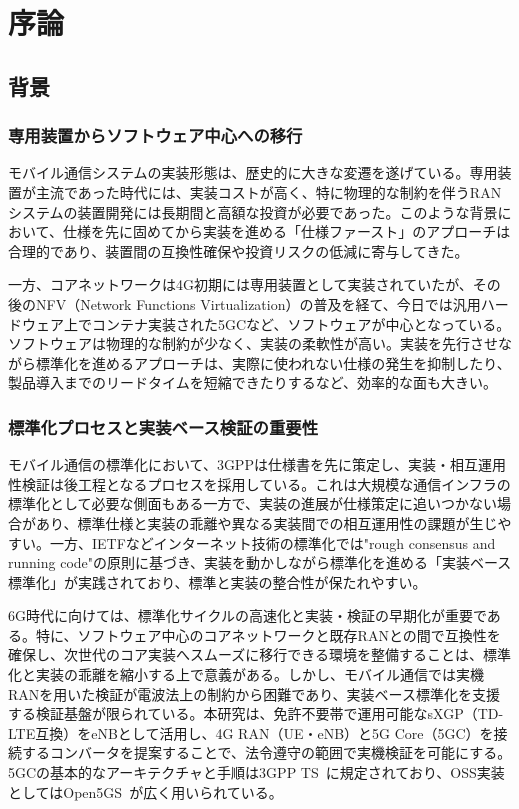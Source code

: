 \chapter{序論}

\section{背景}
\subsection{専用装置からソフトウェア中心への移行}
モバイル通信システムの実装形態は、歴史的に大きな変遷を遂げている。専用装置が主流であった時代には、実装コストが高く、特に物理的な制約を伴うRANシステムの装置開発には長期間と高額な投資が必要であった。このような背景において、仕様を先に固めてから実装を進める「仕様ファースト」のアプローチは合理的であり、装置間の互換性確保や投資リスクの低減に寄与してきた。

一方、コアネットワークは4G初期には専用装置として実装されていたが、その後のNFV（Network Functions Virtualization）の普及を経て、今日では汎用ハードウェア上でコンテナ実装された5GCなど、ソフトウェアが中心となっている。ソフトウェアは物理的な制約が少なく、実装の柔軟性が高い。実装を先行させながら標準化を進めるアプローチは、実際に使われない仕様の発生を抑制したり、製品導入までのリードタイムを短縮できたりするなど、効率的な面も大きい。

\subsection{標準化プロセスと実装ベース検証の重要性}
モバイル通信の標準化において、3GPPは仕様書を先に策定し、実装・相互運用性検証は後工程となるプロセスを採用している。これは大規模な通信インフラの標準化として必要な側面もある一方で、実装の進展が仕様策定に追いつかない場合があり、標準仕様と実装の乖離や異なる実装間での相互運用性の課題が生じやすい。一方、IETFなどインターネット技術の標準化では"rough consensus and running code"の原則に基づき、実装を動かしながら標準化を進める「実装ベース標準化」が実践されており、標準と実装の整合性が保たれやすい。

6G時代に向けては、標準化サイクルの高速化と実装・検証の早期化が重要である。特に、ソフトウェア中心のコアネットワークと既存RANとの間で互換性を確保し、次世代のコア実装へスムーズに移行できる環境を整備することは、標準化と実装の乖離を縮小する上で意義がある。しかし、モバイル通信では実機RANを用いた検証が電波法上の制約から困難であり、実装ベース標準化を支援する検証基盤が限られている。本研究は、免許不要帯で運用可能なsXGP（TD-LTE互換）をeNBとして活用し、4G RAN（UE・eNB）と5G Core（5GC）を接続するコンバータを提案することで、法令遵守の範囲で実機検証を可能にする。5GCの基本的なアーキテクチャと手順は3GPP TS~\cite{threegpp-23501,threegpp-23502}に規定されており、OSS実装としてはOpen5GS~\cite{open5gs}が広く用いられている。

